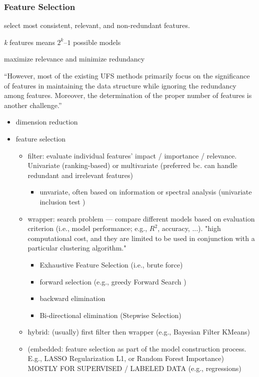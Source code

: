 \subsubsection{Feature Selection}

select most consistent, relevant, and non-redundant features.

\textit{k} features means \(2^k – 1\) possible models

maximize relevance and minimize redundancy

``However, most of the existing UFS methods primarily focus on the
significance of features in maintaining the data structure while
ignoring the redundancy among features. Moreover, the determination of
the proper number of features is another challenge.''

\begin{itemize}
  \item dimension reduction
  \item feature selection
  \begin{itemize}
    \item filter: evaluate individual features' impact / importance / relevance. Univariate (ranking-based) or multivariate (preferred bc. can handle redundant and irrelevant features)
    \begin{itemize}
      \item unvariate, often based on information or spectral analysis (univariate inclusion test \citep[i.e., alpha-corrected t-tests][]{christ2018})
    \end{itemize}
    \item wrapper: search problem --- compare different models based on evaluation criterion (i.e., model performance; e.g., $R^2$, accuracy, ...). "high computational cost, and they are limited to be used in conjunction with a particular clustering algorithm."
    \begin{itemize}
      \item Exhaustive Feature Selection (i.e., brute force)
      \item forward selection (e.g., greedy Forward Search \citep[][]{wang2006})
      \item backward elimination
      \item Bi-directional elimination (Stepwise Selection)
    \end{itemize}
    \item hybrid: (usually) first filter then wrapper (e.g., Bayesian Filter KMeans)
    \item (embedded: feature selection as part of the model construction process. E.g., LASSO Regularization L1, or Random Forest Importance) MOSTLY FOR SUPERVISED / LABELED DATA (e.g., regressions)
  \end{itemize}
\end{itemize}

